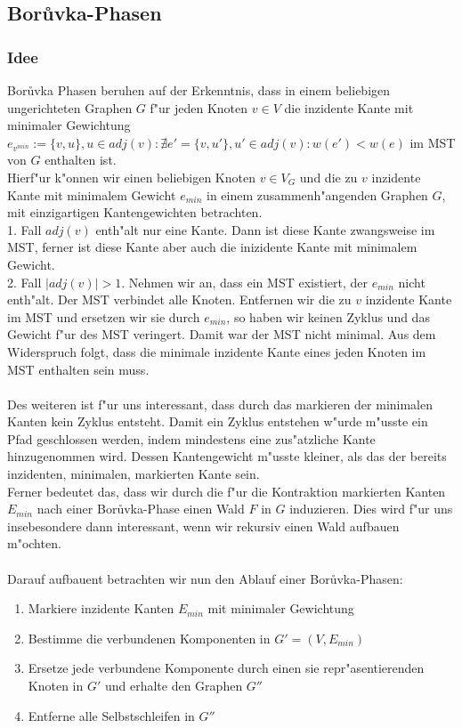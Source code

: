 \subsection{Bor\r uvka-Phasen}

\subsubsection{Idee}
Bor\r uvka Phasen beruhen auf der Erkenntnis, dass in einem beliebigen 
    ungerichteten Graphen $G$ f"ur jeden Knoten $v \in V$ die inzidente Kante mit 
    minimaler Gewichtung 
    $e_{v^{min}} := \{v, u\}, u \in adj(v): 
        \nexists e' = \{v, u'\}, u' \in adj(v): w(e') < w(e)$
    im MST von $G$ enthalten ist.\\
Hierf"ur k"onnen wir einen beliebigen Knoten $v \in V_G$ und die zu $v$ inzidente
    Kante mit minimalem Gewicht $e_{min}$ in einem 
    zusammenh"angenden Graphen $G$, mit einzigartigen Kantengewichten betrachten.\\
1. Fall $adj(v)$ enth"alt nur eine Kante. Dann ist diese Kante zwangsweise im 
    MST, ferner ist diese Kante aber auch die inizidente Kante mit minimalem
    Gewicht.\\
2. Fall $|adj(v)| > 1$. Nehmen wir an, dass ein MST existiert, der $e_{min}$ 
    nicht enth"alt. 
    Der MST verbindet alle Knoten.
    Entfernen wir die zu $v$ inzidente Kante im MST
    und ersetzen wir sie durch $e_{min}$, so haben wir keinen Zyklus und das
    Gewicht f"ur des MST veringert. 
    Damit war der MST nicht minimal.
    Aus dem Widerspruch folgt, dass die minimale inzidente Kante eines jeden
    Knoten im MST enthalten sein muss.\\
\\
Des weiteren ist f"ur uns interessant, dass durch das markieren der minimalen
    Kanten kein Zyklus entsteht. 
    Damit ein Zyklus entstehen w"urde m"usste ein Pfad geschlossen werden, 
    indem mindestens eine zus"atzliche Kante hinzugenommen wird. 
    Dessen Kantengewicht m"usste kleiner, als das der bereits inzidenten, 
    minimalen, markierten Kante sein.\\
Ferner bedeutet das, dass wir durch die f"ur die Kontraktion markierten Kanten
    $E_{min}$ nach einer Bor\r uvka-Phase einen Wald $F$ in $G$ induzieren.
    Dies wird f"ur uns insebesondere dann interessant, wenn
    wir rekursiv einen Wald aufbauen m"ochten.\\
\\
Darauf aufbauent betrachten wir nun den Ablauf einer Bor\r uvka-Phasen:
\begin{enumerate}
    \item Markiere inzidente Kanten $E_{min}$ mit minimaler Gewichtung
    \item Bestimme die verbundenen Komponenten in $G' = (V,E_{min})$
    \item Ersetze jede verbundene Komponente durch einen sie repr"asentierenden
          Knoten in $G'$ und erhalte den Graphen $G''$
    \item Entferne alle Selbstschleifen in $G''$
\end{enumerate}

